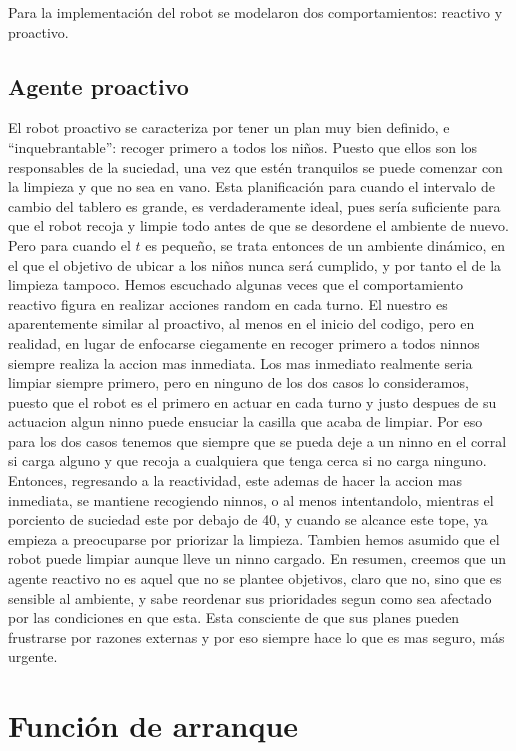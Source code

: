 \documentclass{llncs}
\begin{document}
Para la implementaci\'on del robot se modelaron dos comportamientos: reactivo y proactivo. 

\subsection{Agente proactivo}
El robot proactivo se caracteriza por tener un plan muy bien definido, e ``inquebrantable'': recoger primero a todos los ni\~nos.
Puesto que ellos son los responsables de la suciedad, una vez que est\'en tranquilos se puede comenzar con la limpieza y que no sea en vano. Esta planificaci\'on para cuando el intervalo de cambio del tablero es grande, es verdaderamente ideal, pues ser\'ia 
suficiente para que el robot recoja y limpie todo antes de que se desordene el ambiente de nuevo. Pero para cuando el $t$ es peque\~no, se trata entonces de un ambiente din\'amico, en el que el objetivo de ubicar a los
ni\~nos nunca ser\'a cumplido, y por tanto el de la limpieza tampoco. 
Hemos escuchado algunas veces que el comportamiento reactivo figura en realizar acciones 
random en cada turno. 
El nuestro es aparentemente similar al proactivo, al menos en el inicio del codigo, pero en 
realidad, en lugar de enfocarse ciegamente en recoger
primero a todos ninnos siempre realiza la accion mas inmediata. Los mas inmediato realmente 
seria limpiar siempre primero, pero en ninguno de los dos
casos lo consideramos, puesto que el robot es el primero en actuar en cada turno y justo 
despues de su actuacion algun ninno puede ensuciar la casilla que
acaba de limpiar. Por eso para los dos casos tenemos que siempre que se pueda deje a un 
ninno en el corral si carga alguno y que recoja a cualquiera
que tenga cerca si no carga ninguno. Entonces, regresando a la reactividad, este ademas de 
hacer la accion mas inmediata, se mantiene recogiendo ninnos,
o al menos intentandolo, mientras el porciento de suciedad este por debajo de 40, y cuando se 
alcance este tope, ya empieza a preocuparse por priorizar la limpieza.
Tambien hemos asumido que el robot puede limpiar aunque lleve un ninno cargado. En 
resumen, creemos que un agente reactivo no es aquel que no se plantee
objetivos, claro que no, sino que es sensible al ambiente, y sabe reordenar sus prioridades 
segun como sea afectado por las condiciones en que esta.
Esta consciente de que sus planes pueden frustrarse por razones externas y por eso siempre 
hace lo que es mas seguro, m\'as urgente.

\section{Funci\'on de arranque}
\end{document}
